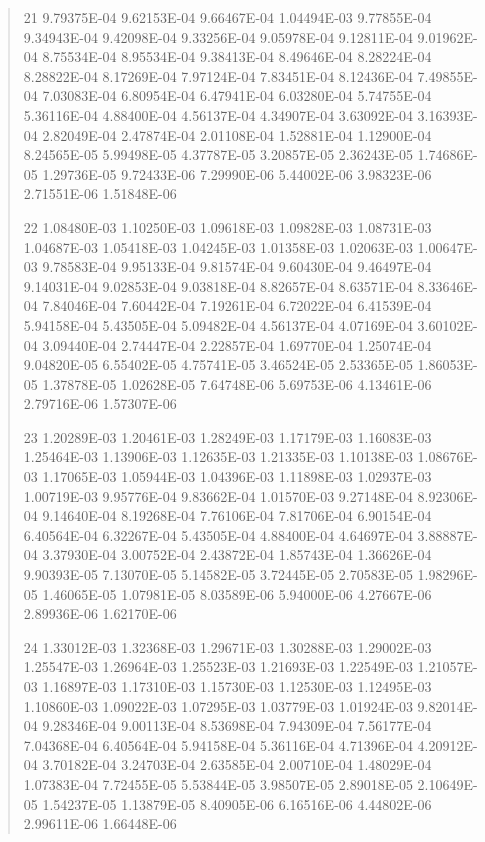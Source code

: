 \documentclass[letterpaper,10pt,english]{sphinxmanual}
\begin{document}
\begin{quote}
\begin{DUlineblock}{0em}
\item[] 21   9.79375E-04  9.62153E-04  9.66467E-04  1.04494E-03  9.77855E-04  9.34943E-04  9.42098E-04  9.33256E-04  9.05978E-04  9.12811E-04  9.01962E-04  8.75534E-04  8.95534E-04  9.38413E-04  8.49646E-04  8.28224E-04  8.28822E-04  8.17269E-04  7.97124E-04  7.83451E-04  8.12436E-04  7.49855E-04  7.03083E-04  6.80954E-04  6.47941E-04  6.03280E-04  5.74755E-04  5.36116E-04  4.88400E-04  4.56137E-04  4.34907E-04  3.63092E-04  3.16393E-04  2.82049E-04  2.47874E-04  2.01108E-04  1.52881E-04  1.12900E-04  8.24565E-05  5.99498E-05  4.37787E-05  3.20857E-05  2.36243E-05  1.74686E-05  1.29736E-05  9.72433E-06  7.29990E-06  5.44002E-06  3.98323E-06  2.71551E-06  1.51848E-06
\item[] 22   1.08480E-03  1.10250E-03  1.09618E-03  1.09828E-03  1.08731E-03  1.04687E-03  1.05418E-03  1.04245E-03  1.01358E-03  1.02063E-03  1.00647E-03  9.78583E-04  9.95133E-04  9.81574E-04  9.60430E-04  9.46497E-04  9.14031E-04  9.02853E-04  9.03818E-04  8.82657E-04  8.63571E-04  8.33646E-04  7.84046E-04  7.60442E-04  7.19261E-04  6.72022E-04  6.41539E-04  5.94158E-04  5.43505E-04  5.09482E-04  4.56137E-04  4.07169E-04  3.60102E-04  3.09440E-04  2.74447E-04  2.22857E-04  1.69770E-04  1.25074E-04  9.04820E-05  6.55402E-05  4.75741E-05  3.46524E-05  2.53365E-05  1.86053E-05  1.37878E-05  1.02628E-05  7.64748E-06  5.69753E-06  4.13461E-06  2.79716E-06  1.57307E-06
\item[] 23   1.20289E-03  1.20461E-03  1.28249E-03  1.17179E-03  1.16083E-03  1.25464E-03  1.13906E-03  1.12635E-03  1.21335E-03  1.10138E-03  1.08676E-03  1.17065E-03  1.05944E-03  1.04396E-03  1.11898E-03  1.02937E-03  1.00719E-03  9.95776E-04  9.83662E-04  1.01570E-03  9.27148E-04  8.92306E-04  9.14640E-04  8.19268E-04  7.76106E-04  7.81706E-04  6.90154E-04  6.40564E-04  6.32267E-04  5.43505E-04  4.88400E-04  4.64697E-04  3.88887E-04  3.37930E-04  3.00752E-04  2.43872E-04  1.85743E-04  1.36626E-04  9.90393E-05  7.13070E-05  5.14582E-05  3.72445E-05  2.70583E-05  1.98296E-05  1.46065E-05  1.07981E-05  8.03589E-06  5.94000E-06  4.27667E-06  2.89936E-06  1.62170E-06
\item[] 24   1.33012E-03  1.32368E-03  1.29671E-03  1.30288E-03  1.29002E-03  1.25547E-03  1.26964E-03  1.25523E-03  1.21693E-03  1.22549E-03  1.21057E-03  1.16897E-03  1.17310E-03  1.15730E-03  1.12530E-03  1.12495E-03  1.10860E-03  1.09022E-03  1.07295E-03  1.03779E-03  1.01924E-03  9.82014E-04  9.28346E-04  9.00113E-04  8.53698E-04  7.94309E-04  7.56177E-04  7.04368E-04  6.40564E-04  5.94158E-04  5.36116E-04  4.71396E-04  4.20912E-04  3.70182E-04  3.24703E-04  2.63585E-04  2.00710E-04  1.48029E-04  1.07383E-04  7.72455E-05  5.53844E-05  3.98507E-05  2.89018E-05  2.10649E-05  1.54237E-05  1.13879E-05  8.40905E-06  6.16516E-06  4.44802E-06  2.99611E-06  1.66448E-06

\end{DUlineblock}
\end{quote}
\end{document}
